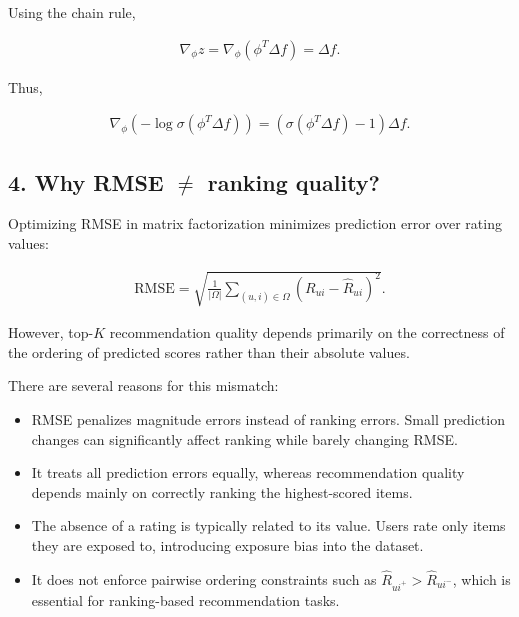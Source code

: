 \documentclass[11pt]{article}
\begin{document}
\begin{appendices}
\noindent Using the chain rule,

\begin{align*}
    \nabla_\phi z = \nabla_\phi (\phi^T \Delta f) = \Delta f.
\end{align*}

\noindent Thus,

\begin{align*}
    \nabla_\phi \left(-\log\sigma(\phi^T \Delta f)\right)
    =
    (\sigma(\phi^T \Delta f)-1)\Delta f.
\end{align*}


\vspace{1cm}

\subsection*{4. Why RMSE $\neq$ ranking quality?}

\noindent Optimizing RMSE in matrix factorization minimizes prediction error over rating values:

\begin{align*}
\text{RMSE}
    =
    \sqrt{
    \frac{1}{|\Omega|}
    \sum_{(u,i)\in\Omega}
    (R_{ui}-\hat{R}_{ui})^2
    }.
\end{align*}

\noindent However, top-$K$ recommendation quality depends primarily on the correctness of the ordering of predicted scores rather than their absolute values.

\noindent There are several reasons for this mismatch:

\begin{itemize}

\item RMSE penalizes magnitude errors instead of ranking errors. Small prediction changes can significantly affect ranking while barely changing RMSE.

\item It treats all prediction errors equally, whereas recommendation quality depends mainly on correctly ranking the highest-scored items.

\item The absence of a rating is typically related to its value. Users rate only items they are exposed to, introducing exposure bias into the dataset.

\item It does not enforce pairwise ordering constraints such as $\hat{R}_{ui^+} > \hat{R}_{ui^-}$, which is essential for ranking-based recommendation tasks.


\end{itemize}
\end{appendices}
\end{document}
